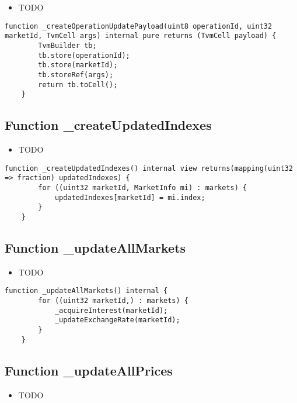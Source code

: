 \noindent\begin{itemize}
\item TODO
\end{itemize}

\begin{lstlisting}[firstnumber=405]
    function _createOperationUpdatePayload(uint8 operationId, uint32 marketId, TvmCell args) internal pure returns (TvmCell payload) {
        TvmBuilder tb;
        tb.store(operationId);
        tb.store(marketId);
        tb.storeRef(args);
        return tb.toCell();
    }
\end{lstlisting}

\subsection{Function \_{}createUpdatedIndexes}

\noindent\begin{itemize}
\item TODO
\end{itemize}

\begin{lstlisting}[firstnumber=399]
    function _createUpdatedIndexes() internal view returns(mapping(uint32 => fraction) updatedIndexes) {
        for ((uint32 marketId, MarketInfo mi) : markets) {
            updatedIndexes[marketId] = mi.index;
        }
    }
\end{lstlisting}

\subsection{Function \_{}updateAllMarkets}

\noindent\begin{itemize}
\item TODO
\end{itemize}

\begin{lstlisting}[firstnumber=118]
    function _updateAllMarkets() internal {
        for ((uint32 marketId,) : markets) {
            _acquireInterest(marketId);
            _updateExchangeRate(marketId);
        }
    }
\end{lstlisting}

\subsection{Function \_{}updateAllPrices}

\noindent\begin{itemize}
\item TODO
\end{itemize}

